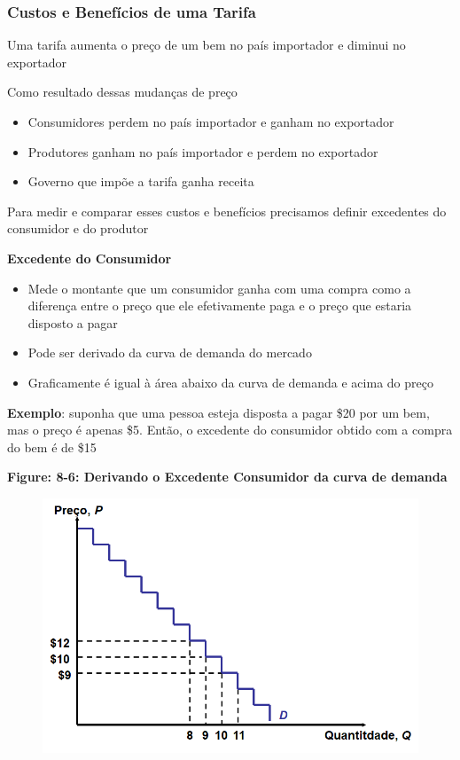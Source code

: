 \documentclass[a4paper,12pt]{article}[abntex2]
\begin{document}
\subsubsection{\textbf{Custos e Benefícios de uma Tarifa}}

Uma tarifa aumenta o preço de um bem no país importador e diminui no exportador

Como resultado dessas mudanças de preço
\begin{itemize}
  \item Consumidores perdem no país importador e ganham no exportador
  \item Produtores ganham no país importador e perdem no exportador
  \item Governo que impõe a tarifa ganha receita
\end{itemize}

Para medir e comparar esses custos e benefícios precisamos definir excedentes do consumidor e do produtor

\textbf{Excedente do Consumidor}
\begin{itemize}
  \item Mede o montante que um consumidor ganha com uma compra como a diferença entre o preço que ele efetivamente paga e o preço que estaria disposto a pagar
  \item Pode ser derivado da curva de demanda do mercado
  \item Graficamente é igual à área abaixo da curva de demanda e acima do preço
\end{itemize}

\textbf{Exemplo}: suponha que uma pessoa esteja disposta a pagar \$20 por um bem, mas o preço é apenas \$5. Então, o excedente do consumidor obtido com a compra do bem é de \$15

\textbf{Figure: 8-6: Derivando o Excedente Consumidor da curva de demanda}

\begin{figure}[H]
    \centering
    \includegraphics[width=0.7\linewidth]{Imagens/a20i2.png}
\end{figure}
\end{document}
